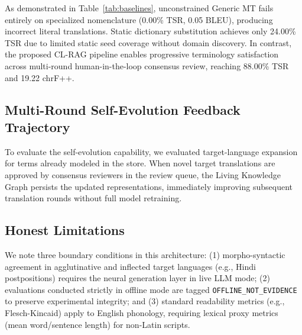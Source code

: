\documentclass[conference]{IEEEtran}
\begin{document}
As demonstrated in Table~\ref{tab:baselines}, unconstrained Generic MT fails entirely on specialized nomenclature (0.00\% TSR, 0.05 BLEU), producing incorrect literal translations. Static dictionary substitution achieves only 24.00\% TSR due to limited static seed coverage without domain discovery. In contrast, the proposed CL-RAG pipeline enables progressive terminology satisfaction across multi-round human-in-the-loop consensus review, reaching 88.00\% TSR and 19.22 chrF++.

\subsection{Multi-Round Self-Evolution Feedback Trajectory}
To evaluate the self-evolution capability, we evaluated target-language expansion for terms already modeled in the store. When novel target translations are approved by consensus reviewers in the review queue, the Living Knowledge Graph persists the updated representations, immediately improving subsequent translation rounds without full model retraining.

\subsection{Honest Limitations}
We note three boundary conditions in this architecture: (1) morpho-syntactic agreement in agglutinative and inflected target languages (e.g., Hindi postpositions) requires the neural generation layer in live LLM mode; (2) evaluations conducted strictly in offline mode are tagged \texttt{OFFLINE\_NOT\_EVIDENCE} to preserve experimental integrity; and (3) standard readability metrics (e.g., Flesch-Kincaid) apply to English phonology, requiring lexical proxy metrics (mean word/sentence length) for non-Latin scripts.
\end{document}
